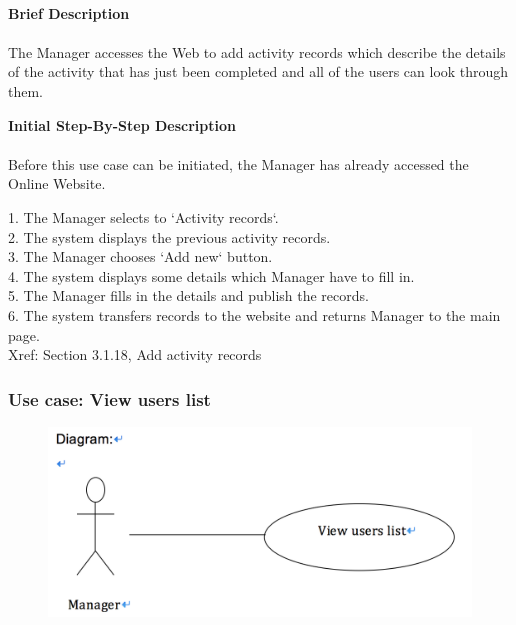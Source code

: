 \documentclass[12pt]{report}
\begin{document}
\paragraph{}
\begin{flushleft}
\textbf{Brief Description }
\paragraph{}
The Manager accesses the Web to add activity records which describe the details of the activity that has just been completed and all of the users can look through them.\\

\begin{flushleft}
\textbf{Initial Step-By-Step Description }
\paragraph{}
Before this use case can be initiated, the Manager has already accessed the Online Website.

\begin{flushleft}
1.	The Manager selects to `Activity records`. \\
2.	The system displays the previous activity records. \\
3.	The Manager chooses `Add new` button. \\
4.	The system displays some details which Manager have to fill in. \\
5.	The Manager fills in the details and publish the records. \\
6.	The system transfers records to the website and returns Manager to the main page. \\
Xref: Section 3.1.18, Add activity records
\end{flushleft}
\end{flushleft}
\end{flushleft}


\newpage
\subsubsection{Use case:  View users list }

\begin{figure}[!htb]
  \includegraphics{25.PNG}
\end{figure}
\end{document}
